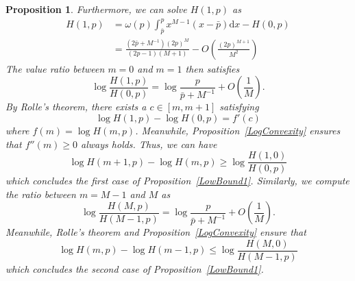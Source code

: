 \documentclass{article}
\makeatletter
\newtheorem{proposition}[theorem]{Proposition}
\renewenvironment{proof}[1][\proofname]{\par
  \vspace{-\topsep}%
  \pushQED{\qed}%
  \normalfont
  \topsep0pt \partopsep0pt %
  \trivlist
  \item[\hskip\labelsep
        \itshape
    #1\@addpunct{.}]\ignorespaces
}{%
  \popQED\endtrivlist\@endpefalse
  \addvspace{0pt plus 0pt} %
}
\makeatother
\begin{document}
\begin{proposition}
\begin{proof}
Furthermore, we can solve $H(1,p)$ as
\begin{equation}
\begin{split}
H(1,p)&= \omega(p)\int_{\bar{p}}^{p}x^{M-1}(x-\bar{p})\mathrm{d}x-H(0,p)\\
&=\frac{(2\bar{p}+M^{-1})(2p)^{M}}{(2p-1)(M+1)} - O\left(\frac{(2p)^{M+1}}{M^2}\right)
\end{split}
\end{equation}
The value ratio between $m=0$ and $m=1$ then satisfies
\begin{equation}
\log \frac{H(1,p)}{H(0,p)}  = \log\frac{p}{\bar{p}+M^{-1}}+O\left(\frac{1}{M}\right).
\end{equation}
By Rolle's theorem, there exists a $c\in [m, m+1]$ satisfying
\begin{equation}
\log H(1,p) - \log H(0,p) = f'(c)
\end{equation}
where $f(m)=\log H(m,p)$. Meanwhile, Proposition~\ref{LogConvexity} ensures that $f''(m)\geq 0$ always holds. Thus, we can have
\begin{equation}
\log H(m+1,p) - \log H(m,p)\geq \log \frac{H(1,0)}{H(0,p)}
\end{equation}
which concludes the first case of Proposition~\ref{LowBound1}. Similarly, we compute the ratio between $m=M-1$ and $M$ as
\begin{equation}
\log \frac{H(M,p)}{H(M-1,p)}  = \log\frac{p}{\bar{p}+M^{-1}}+O\left(\frac{1}{M}\right).
\end{equation}
Meanwhile, Rolle's theorem and Proposition~\ref{LogConvexity} ensure that
\begin{equation}
\log H(m,p) - \log H(m-1,p)\leq \log \frac{H(M,0)}{H(M-1,p)}
\end{equation}
which concludes the second case of Proposition~\ref{LowBound1}.


\end{proof}
\end{proposition}
\end{document}
